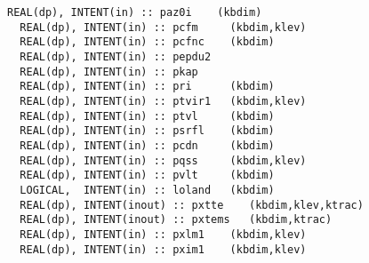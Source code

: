 \begin{lstlisting}[caption=vdiff\_subm]
  REAL(dp), INTENT(in) :: paz0i    (kbdim)         
  REAL(dp), INTENT(in) :: pcfm     (kbdim,klev)    
  REAL(dp), INTENT(in) :: pcfnc    (kbdim)         
  REAL(dp), INTENT(in) :: pepdu2                   
  REAL(dp), INTENT(in) :: pkap                     
  REAL(dp), INTENT(in) :: pri      (kbdim)         
  REAL(dp), INTENT(in) :: ptvir1   (kbdim,klev)    
  REAL(dp), INTENT(in) :: ptvl     (kbdim)         
  REAL(dp), INTENT(in) :: psrfl    (kbdim)         
  REAL(dp), INTENT(in) :: pcdn     (kbdim)         
  REAL(dp), INTENT(in) :: pqss     (kbdim,klev)    
  REAL(dp), INTENT(in) :: pvlt     (kbdim)         
  LOGICAL,  INTENT(in) :: loland   (kbdim)         
  REAL(dp), INTENT(inout) :: pxtte    (kbdim,klev,ktrac)
  REAL(dp), INTENT(inout) :: pxtems   (kbdim,ktrac)     
  REAL(dp), INTENT(in) :: pxlm1    (kbdim,klev)      
  REAL(dp), INTENT(in) :: pxim1    (kbdim,klev)      
\end{lstlisting}

